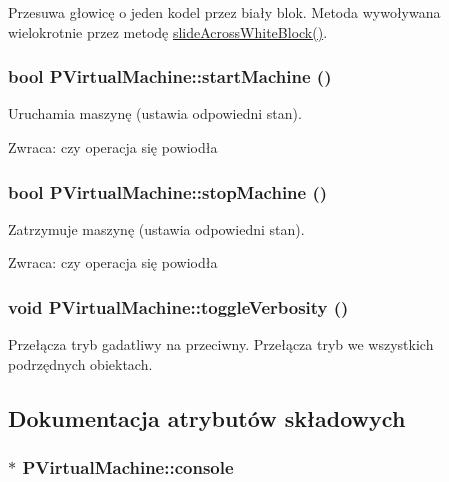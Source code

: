 Przesuwa głowicę o jeden kodel przez biały blok. Metoda wywoływana wielokrotnie przez metodę \hyperlink{classPVirtualMachine_4b2ebb998393324c5240dc48fdb14f3a}{slideAcrossWhiteBlock()}. \hypertarget{classPVirtualMachine_4b6bb128d63569e855684128b5e09f1c}{
\subsubsection[{startMachine}]{\setlength{\rightskip}{0pt plus 5cm}bool PVirtualMachine::startMachine ()}}
\label{classPVirtualMachine_4b6bb128d63569e855684128b5e09f1c}


Uruchamia maszynę (ustawia odpowiedni stan). \begin{Desc}
\item[Zwraca:]czy operacja się powiodła \end{Desc}
\hypertarget{classPVirtualMachine_fa30f1871832c1af18519db03c397ac0}{
\subsubsection[{stopMachine}]{\setlength{\rightskip}{0pt plus 5cm}bool PVirtualMachine::stopMachine ()}}
\label{classPVirtualMachine_fa30f1871832c1af18519db03c397ac0}


Zatrzymuje maszynę (ustawia odpowiedni stan). \begin{Desc}
\item[Zwraca:]czy operacja się powiodła \end{Desc}
\hypertarget{classPVirtualMachine_1e48dcf68b3b80d7f6d3c67b3f796e51}{
\subsubsection[{toggleVerbosity}]{\setlength{\rightskip}{0pt plus 5cm}void PVirtualMachine::toggleVerbosity ()}}
\label{classPVirtualMachine_1e48dcf68b3b80d7f6d3c67b3f796e51}


Przełącza tryb gadatliwy na przeciwny. Przełącza tryb we wszystkich podrzędnych obiektach. 

\subsection{Dokumentacja atrybutów składowych}
\hypertarget{classPVirtualMachine_67feeb2d88b4c8b766d10d6f7d8eb65b}{
\subsubsection[{console}]{$\ast$ {\bf PVirtualMachine::console}}}
\label{classPVirtualMachine_67feeb2d88b4c8b766d10d6f7d8eb65b}


